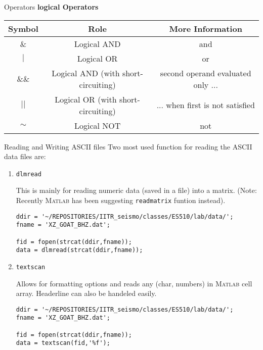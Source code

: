 \documentclass[11pt,titlepage,fleqn]{article}
\newcommand{\matlab}{\textsc{Matlab}\xspace}
\begin{document}
\begin{section}{Operators}
{\bf logical Operators}
\begin{tabular}{|c|c|c|}
\hline
Symbol  &	Role  &	More Information \\
\hline
\& &	Logical AND &	and\\
$|$ &	Logical OR  &	or\\
\&\& &	Logical AND (with short-circuiting) & second operand evaluated only ...\\
$||$ &	Logical OR (with short-circuiting)  & ... when first is not satisfied\\
$\sim$ &	Logical NOT &	not\\
\hline
\end{tabular}
\end{section}

\begin{section}{Reading and Writing ASCII files}
Two most used function for reading the ASCII data files are:
\begin{enumerate}
\item \verb+dlmread+

This is mainly for reading numeric data (saved in a file) into a matrix.
(Note: Recently \matlab has been suggesting \verb+readmatrix+ funtion instead).

\begin{verbatim}
ddir = '~/REPOSITORIES/IITR_seismo/classes/ES510/lab/data/';
fname = 'XZ_GOAT_BHZ.dat';
    
fid = fopen(strcat(ddir,fname));
data = dlmread(strcat(ddir,fname));
\end{verbatim}
\item \verb+textscan+ 

Allows for formatting options and reads any (char, numbers) in \matlab cell array. Headerline can also be handeled easily.

\begin{verbatim}
ddir = '~/REPOSITORIES/IITR_seismo/classes/ES510/lab/data/';
fname = 'XZ_GOAT_BHZ.dat';
    
fid = fopen(strcat(ddir,fname));
data = textscan(fid,'%f');
\end{verbatim}
\end{enumerate}
\end{section}


\end{document}
